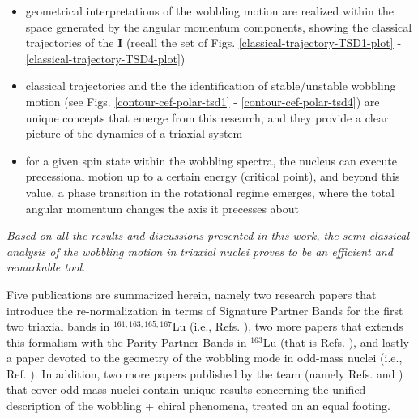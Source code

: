 \begin{itemize}
    \item geometrical interpretations of the wobbling motion are realized within the space generated by the angular momentum components, showing the classical trajectories of the $\mathbf{I}$ (recall the set of Figs. \ref{classical-trajectory-TSD1-plot} - \ref{classical-trajectory-TSD4-plot})
    \item classical trajectories and the the identification of stable/unstable wobbling motion (see Figs. \ref{contour-cef-polar-tsd1} - \ref{contour-cef-polar-tsd4}) are unique concepts that emerge from this research, and they provide a clear picture of the dynamics of a triaxial system
    \item for a given spin state within the wobbling spectra, the nucleus can execute precessional motion up to a certain energy (critical point), and beyond this value, a phase transition in the rotational regime emerges, where the total angular momentum changes the axis it precesses about
\end{itemize}

\emph{Based on all the results and discussions presented in this work, the semi-classical analysis of the wobbling motion in triaxial nuclei proves to be an efficient and remarkable tool.}

Five publications are summarized herein, namely two research papers that introduce the re-normalization in terms of Signature Partner Bands for the first two triaxial bands in $^{161,163,165,167}$Lu (i.e., Refs. \cite{raduta2020approach,raduta2020towards}), two more papers that extends this formalism with the Parity Partner Bands in $^{163}$Lu (that is Refs. \cite{poenaru2021parity,poenaru2021extensive1}), and lastly a paper devoted to the geometry of the wobbling mode in odd-mass nuclei (i.e., Ref. \cite{poenaru2021extensive2}). In addition, two more papers published by the team (namely Refs. \cite{raduta2020new} and \cite{raduta2022simultaneous}) that cover odd-mass nuclei contain unique results concerning the unified description of the wobbling + chiral phenomena, treated on an equal footing.